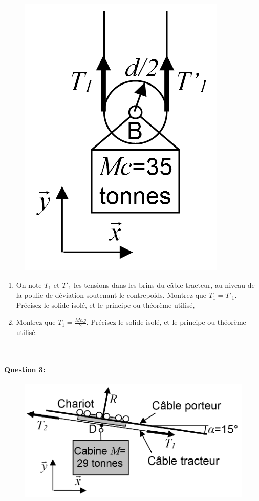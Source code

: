\begin{figure}
	\vspace{-20pt}
	\centering \includegraphics[width=0.7\linewidth]{img/fig19}
	\label{fig19}
\end{figure}

\begin{enumerate}
 \item On note $T_1$ et $T'_1$ les tensions dans les brins du câble tracteur, au niveau de la poulie de déviation soutenant le contrepoids. Montrez que $T_1=T'_1$. Précisez le solide isolé, et le principe ou théorème utilisé,
\item Montrez que $T_1=\frac{Mc.g}{2}$. Précisez le solide isolé, et le principe ou théorème utilisé.
\end{enumerate}

~\

\paragraph{Question 3:}

\begin{figure}
	\vspace{-20pt}
	\centering \includegraphics[width=0.8\linewidth]{img/fig20}
	\label{fig20}
\end{figure}

